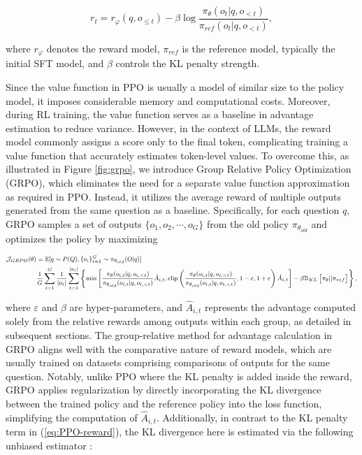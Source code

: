 \begin{equation}
    r_{t} = r_\varphi(q, o_{\le t}) - \beta \log\frac{\pi_{\theta}(o_{t}|q, o_{<t})}{\pi_{ref}(o_{t}|q, o_{<t})},
\label{eq:PPO-reward}
\end{equation}

where $r_\varphi$ denotes the reward model, $\pi_{ref}$ is the reference model, typically the initial SFT model, and $\beta$ controls the KL penalty strength.

Since the value function in PPO is usually a model of similar size to the policy model, it imposes considerable memory and computational costs. Moreover, during RL training, the value function serves as a baseline in advantage estimation to reduce variance. However, in the context of LLMs, the reward model commonly assigns a score only to the final token, complicating training a value function that accurately estimates token-level values. To overcome this, as illustrated in Figure \ref{fig:grpo}, we introduce Group Relative Policy Optimization (GRPO), which eliminates the need for a separate value function approximation as required in PPO. Instead, it utilizes the average reward of multiple outputs generated from the same question as a baseline. Specifically, for each question $q$, GRPO samples a set of outputs $\{o_1, o_2, \cdots, o_G\}$ from the old policy $\pi_{\theta_{old}}$ and optimizes the policy by maximizing

\begin{equation}
\footnotesize
\begin{split}
    \mathcal{J}_{GRPO}(\theta) &= \mathbb{E}{[q \sim P(Q), \{o_i\}_{i=1}^G \sim \pi_{\theta_{old}}(O|q)]}  \\
    & \frac{1}{G}\sum_{i=1}^G\frac{1}{|o_i|} \sum_{t=1}^{|o_i|} \left\{ \min \left[ \frac{\pi_\theta(o_{i,t} | q, o_{i,<t})}{\pi_{\theta_{old}}(o_{i,t} | q, o_{i,<t})} \hat{A}_{i,t}, \text{clip} \left( \frac{\pi_\theta(o_{i,t} | q, o_{i,<t})}{\pi_{\theta_{old}}(o_{i,t} | q, o_{i,<t})}, 1 - \varepsilon, 1 + \varepsilon \right)  \hat{A}_{i,t} \right] - \beta \mathbb{D}_{KL}\left[\pi_{\theta} || \pi_{ref}\right]\right\} ,
\end{split}
\label{eq:GRPO-obj}
\end{equation}

where $\varepsilon$ and $\beta$ are hyper-parameters, and $\hat{A}_{i,t}$ represents the advantage computed solely from the relative rewards among outputs within each group, as detailed in subsequent sections. The group-relative method for advantage calculation in GRPO aligns well with the comparative nature of reward models, which are usually trained on datasets comprising comparisons of outputs for the same question. Notably, unlike PPO where the KL penalty is added inside the reward, GRPO applies regularization by directly incorporating the KL divergence between the trained policy and the reference policy into the loss function, simplifying the computation of $\hat{A}_{i,t}$. Additionally, in contrast to the KL penalty term in (\ref{eq:PPO-reward}), the KL divergence here is estimated via the following unbiased estimator \citep{kl_approx}:

